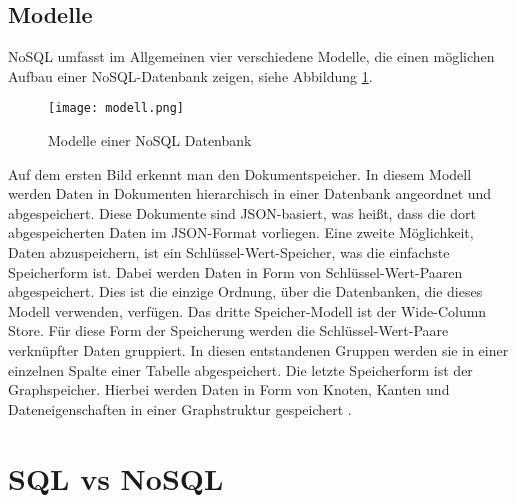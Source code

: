 \subsection{Modelle}

NoSQL umfasst im Allgemeinen vier verschiedene Modelle, die einen möglichen Aufbau einer NoSQL-Datenbank zeigen, siehe Abbildung \ref*{img:modell}.

\begin{figure}
    \centering
    \texttt{[image: modell.png]}
    \label{img:modell}
    \caption{Modelle einer NoSQL Datenbank  \cite{drei}}
\end{figure}

Auf dem ersten Bild erkennt man den Dokumentspeicher. In diesem Modell werden Daten in Dokumenten hierarchisch in einer Datenbank angeordnet und abgespeichert. Diese Dokumente sind JSON-basiert, was heißt, dass die dort abgespeicherten Daten im JSON-Format vorliegen.
Eine zweite Möglichkeit, Daten abzuspeichern, ist ein Schlüssel-Wert-Speicher, was die einfachste Speicherform ist. Dabei werden Daten in Form von Schlüssel-Wert-Paaren abgespeichert. Dies ist die einzige Ordnung, über die Datenbanken, die dieses Modell verwenden, verfügen.
Das dritte Speicher-Modell ist der Wide-Column Store. Für diese Form der Speicherung werden die Schlüssel-Wert-Paare verknüpfter Daten gruppiert. In diesen entstandenen Gruppen werden sie in einer einzelnen Spalte einer Tabelle abgespeichert.
Die letzte Speicherform ist der Graphspeicher. Hierbei werden Daten in Form von Knoten, Kanten und Dateneigenschaften in einer Graphstruktur gespeichert \cite{drei}.


\section{SQL vs NoSQL}

